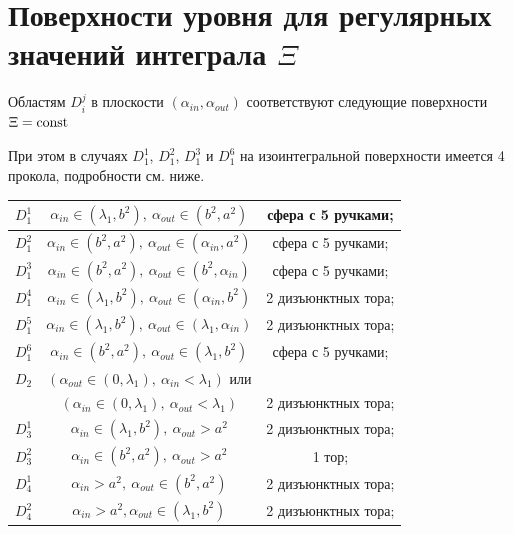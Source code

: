 \section{Поверхности уровня для регулярных значений интеграла $\Xi$}
\begin{theorem} 
Областям $D_i^j$ в плоскости $(\alpha_{in}, \alpha_{out})$ соответствуют следующие поверхности $\Xi = \mathrm{const}$
\begin{remark}%
При этом в случаях $D_1^1$, $D_1^2$, $D_1^3$ и $D_1^6$ на изоинтегральной поверхности имеется 4 прокола, подробности см. ниже.
\end{remark}%
\medskip
\begin{center}
\begin{tabular}{|c|c|c|}
\hline 
$D_1^1$  	& 	$\alpha_{in} \in (\lambda_1, b^2), \ \alpha_{out} \in (b^2, a^2)$			& сфера с 5 ручками; \\ \hline 
$D_1^2$  	& 	$\alpha_{in} \in (b^2, a^2), \ \alpha_{out} \in (\alpha_{in}, a^2)$				& сфера с 5 ручками; \\ \hline 
$D_1^3$  	& 	$\alpha_{in} \in (b^2, a^2), \ \alpha_{out} \in (b^2, \alpha_{in})$				& сфера с 5 ручками; \\ \hline 
$D_1^4$ 	& 	$\alpha_{in} \in (\lambda_1, b^2), \ \alpha_{out} \in (\alpha_{in}, b^2)$	& 2 дизъюнктных тора; \\ \hline 
$D_1^5$  	& 	$\alpha_{in} \in (\lambda_1, b^2), \ \alpha_{out} \in (\lambda_1, \alpha_{in})$	& 2 дизъюнктных тора; \\ \hline 
$D_1^6$  	& 	$\alpha_{in} \in (b^2, a^2), \ \alpha_{out} \in (\lambda_1, b^2)$			& сфера с 5 ручками; \\ \hline 
\hline
$D_2$  	& 	$(\alpha_{out} \in (0, \lambda_1), \ \alpha_{in} < \lambda_1)$ или & \\
		&  $(\alpha_{in} \in (0, \lambda_1), \ \alpha_{out} < \lambda_1)$				& 2 дизъюнктных тора; \\ \hline
 \hline
$D_3^1$  	& 	$\alpha_{in} \in (\lambda_1, b^2), \ \alpha_{out} > a^2$				& 2 дизъюнктных тора; \\ \hline 
$D_3^2$  	& 	$\alpha_{in} \in (b^2, a^2), \ \alpha_{out} > a^2 $					& 1 тор; \\ \hline 
\hline 
$D_4^1$  	& 	$\alpha_{in} > a^2, \ \alpha_{out} \in (b^2, a^2)$						& 2 дизъюнктных тора; \\ \hline 
$D_4^2$  	& 	$\alpha_{in} > a^2, \alpha_{out} \in (\lambda_1, b^2)$				& 2 дизъюнктных тора; \\ \hline 

\end{tabular}
\end{center}
\end{theorem}
